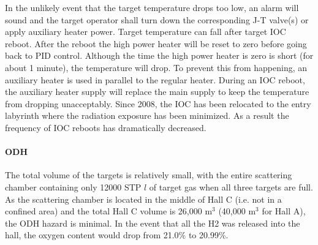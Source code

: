 In the unlikely event that the target temperature drops too low, an
alarm will sound and the target operator shall turn down the corresponding
J-T valve(s) or apply auxiliary heater power. Target temperature
can fall after target IOC reboot. After the reboot the high power heater
will be reset to zero before going back to PID control. Although the
time the high power heater is zero is short (for about 1 minute),
the temperature will drop. To prevent this from happening, an auxiliary
heater is used in parallel to the regular heater. During an IOC reboot,
the auxiliary heater supply will replace the main supply to keep the
temperature from dropping unacceptably. Since 2008, the IOC has been
relocated to the entry labyrinth where the radiation exposure has
been minimized. As a result the frequency of IOC reboots has dramatically
decreased.

\paragraph{ODH}
\label{sec:targ:odh}

The total volume of the targets is relatively small, with the entire
scattering chamber containing only 12000 STP $l$ of target gas when
all three targets are full. As the scattering chamber is located in
the middle of Hall C (i.e. not in a confined area) and the total Hall
C  volume is 26,000 m$^{3}$ (40,000 m$^{3}$ for Hall A), the ODH hazard is minimal. In the event that all the H2 was released into the hall, the oxygen content would drop from 21.0\% to 20.99\%.

